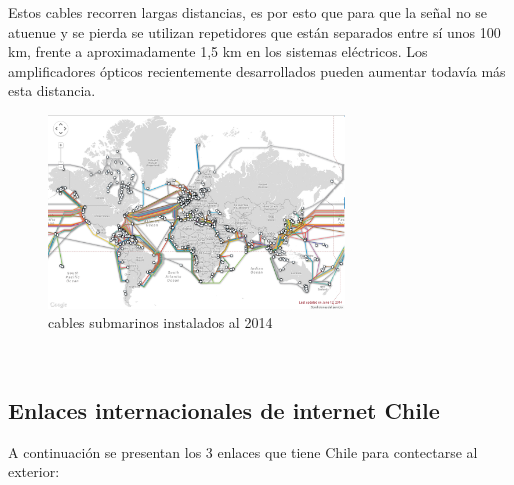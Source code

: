 \documentclass[a4paper]{article}
\begin{document}
Estos cables recorren largas distancias, es por esto que para que la señal no se atuenue y se pierda se utilizan repetidores que están separados entre sí unos 100 km, frente a aproximadamente 1,5 km en los sistemas eléctricos. Los amplificadores ópticos recientemente desarrollados pueden aumentar todavía más esta distancia.

\begin{figure}[H]
\centering
\includegraphics[width=0.7\textwidth]{Mapa_del_cableado_submarino.PNG}
\caption{\label{fig:mapa}cables submarinos instalados al 2014}
\end{figure}

~\\

\subsection{Enlaces internacionales de internet Chile}

A continuación se presentan los 3 enlaces que tiene Chile para contectarse al exterior:
\end{document}
